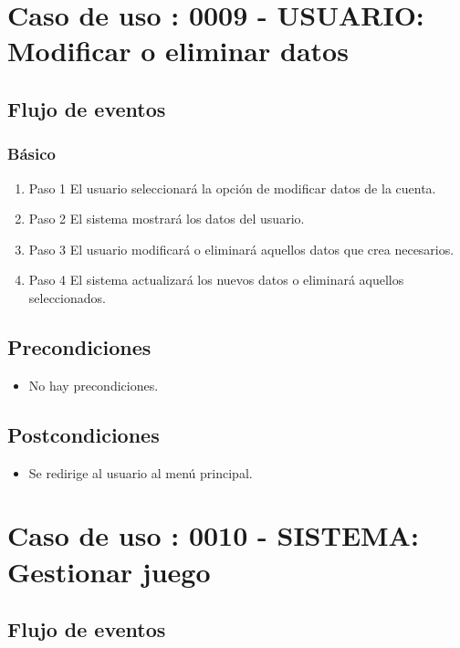 \section{Caso de uso : 0009 - USUARIO: Modificar o eliminar datos}\label{sec:uc0}

\subsection{Flujo de eventos}

\subsubsection{Básico}

\begin{enumerate}
\item Paso 1
El usuario seleccionará la opción de modificar datos de la cuenta.
\item Paso 2
El sistema mostrará los datos del usuario.
\item Paso 3
El usuario modificará o eliminará aquellos datos que crea necesarios.
\item Paso 4
El sistema actualizará los nuevos datos o eliminará aquellos seleccionados.
\end{enumerate}


\subsection{Precondiciones}
\begin{itemize}
\item No hay precondiciones.
\end{itemize}
\subsection{Postcondiciones}
\begin{itemize}
\item Se redirige al usuario al menú principal.
\end{itemize}



\section{Caso de uso : 0010 - SISTEMA: Gestionar juego}\label{sec:uc0}

\subsection{Flujo de eventos}

